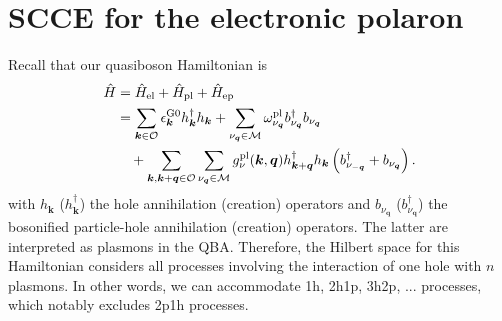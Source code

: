 \section{SCCE for the electronic polaron}
Recall that our quasiboson Hamiltonian is
\begin{align}
\hat{H}
&=
\hat{H}_{\rm el}
+
\hat{H}_{\rm pl}
+
\hat{H}_{\rm ep}
\\
&=
\sum_{\bm{k}\in\mathcal{O}}
\epsilon_{\bm{k}}^{\rm G0}
h_{\bm{k}}^{\dagger}h_{\bm{k}}
+
\sum_{\nu_{\bm{q}}\in\mathcal{M}}
\omega_{\nu_{\bm{q}}}^{\rm pl}
b_{\nu_{\bm{q}}}^{\dagger}
b_{\nu_{\bm{q}}}
\nonumber\\
&\quad
+
\sum_{\bm{k},\bm{k}+\bm{q}\in\mathcal{O}}
\sum_{\nu_{\bm{q}}\in\mathcal{M}}
g_{\nu}^{\rm pl}(\bm{k},\bm{q})
h_{\bm{k}+\bm{q}}^{\dagger}
h_{\bm{k}}
\left(
b_{\nu_{-\bm{q}}}^{\dagger}
+
b_{\nu_{\bm{q}}}
\right).
\label{eq:H}
\end{align}
with $h_{\bm{k}}$ ($h_{\bm{k}}^{\dagger}$) the hole annihilation (creation) operators and $b_{\nu_{\bm{q}}}$ ($b_{\nu_{\bm{q}}}^{\dagger}$) the bosonified particle-hole  annihilation (creation) operators. The latter are interpreted as plasmons in the QBA. Therefore, the Hilbert space for this Hamiltonian considers all processes involving the interaction of one hole with $n$ plasmons. In other words, we can accommodate 1h, 2h1p, 3h2p, ... processes, which notably excludes 2p1h processes.
